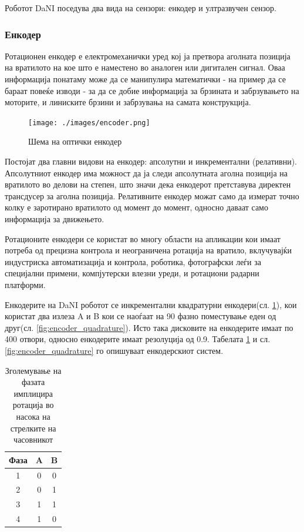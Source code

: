 \documentclass[11pt]{article}
\begin{document}
    Роботот DaNI поседува два вида на сензори: енкодер и ултразвучен сензор.

    \subsubsection{Енкодер}
      Ротационен енкодер е електромеханички уред кој ја претвора аголната позиција на вратилото на кое што е наместено во аналоген или дигитален сигнал. Оваа информација понатаму може да се манипулира математички - на пример да се бараат повеќе изводи - за да се добие информација за брзината и забрзувањето на моторите, и линиските брзини и забрзувања на самата конструкција.

      \begin{figure}[h]
        \texttt{[image: ./images/encoder.png]}
        \centering
        \caption{Шема на оптички енкодер}
        \label{fig:encoder}
        \end{figure}

		  Постојат два главни видови на енкодер: апсолутни и инкрементални (релативни). Апсолутниот енкодер има можност да ја следи апсолутната аголна позиција на вратилото во делови на степен, што значи дека енкодерот претставува директен трансдусер за аголна позиција.
      Релативните енкодер можат само да измерат точно колку е заротирано вратилото од момент до момент, односно даваат само информација за движењето.

		  Ротационите енкодери се користат во многу области на апликации кои имаат потреба од прецизна контрола и неограничена ротација на вратило, вклучувајќи индустриска автоматизација и контрола, роботика, фотографски леѓи за специјални примени, компјутерски влезни уреди, и ротациони радарни платформи.

		  Енкодерите на DaNI роботот се инкрементални квадратурни енкодери(сл. \ref{fig:encoder}), кои користат два излеза A и B кои се наоѓаат на 90 \degree фазно поместување еден од друг(сл. \ref{fig:encoder_quadrature}). Исто така дисковите на енкодерите имаат по 400 отвори, односно енкодерите имаат резолуција од 0.9\degree. Табелата \ref{tab:fazno} и сл. \ref{fig:encoder_quadrature} го опишуваат енкодерскиот систем.

		  \begin{table}[h]
        \caption{Зголемување на фазата имплицира ротација во насока на стрелките на часовникот}
        \label{tab:fazno}
        \begin{center}
          \begin{tabular}{||c|c|c||}
            \hline
            Фаза & A & B \\
            \hline \hline
            1 & 0 & 0 \\
            \hline
					  2 & 0 & 1 \\
            \hline
            3 & 1 & 1 \\
            \hline
            4 & 1 & 0 \\
            \hline
            \end{tabular}
          \end{center}
        \end{table}
\end{document}
